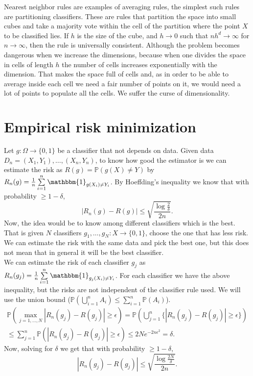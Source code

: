 \documentclass[11pt, english]{article}
\begin{document}
Nearest neighbor rules are examples of averaging rules, the simplest such rules are partitioning classifiers. These are rules that partition the space into small cubes and take a majority vote within the cell of the partition where the point $X$ to be classified lies. If $h$ is the size of the cube, and $h\rightarrow 0$ such that $nh^d\rightarrow \infty$ for $n\rightarrow\infty$, then the rule is universally consistent. 
Although the problem becomes dangerous when we increase the dimensions, because when one divides the space in cells of length $h$ the number of cells increases exponentially with the dimension. That makes the space full of cells and, as in order to be able to average inside each cell we need a fair number of points on it, we would need a lot of points to populate all the cells. We suffer the curse of dimensionality.\\

\section{Empirical risk minimization}

Let $g:\Omega\rightarrow\{0,1\}$ be a classifier that not depends on data. Given data $D_n=(X_1,Y_1),\dots,(X_n,Y_n)$, to know how good the estimator is we can estimate the risk as $R(g)=\mathbb{P}(g(X)\neq Y)$ by $R_n(g)=\frac{1}{n}\sum\limits_{i=1}^n\mathbbm{1}_{g(X_i)\neq Y_i}$. By Hoeffding's inequality we know that with probability $\geq 1-\delta$, 
\begin{equation}
	|R_n(g)-R(g)|\leq\sqrt{\frac{\log\frac{2}{\delta}}{2n}}.
\end{equation}
Now, the idea would be to know among different classifiers which is the best. That is given $N$ classifiers $g_1,\dots,g_N: X\rightarrow\{0,1\}$, choose the one that has less risk. We can estimate the risk with the same data and pick the best one, but this does not mean that in general it will be the best classifier.\\

We can estimate the risk of each classifier $g_j$ as $R_n(g_j)=\frac{1}{n}\sum\limits_{i=1}^n \mathbbm{1}_{g_j(X_i)\neq Y_i}$. For each classifier we have the above inequality, but the risks are not independent of the classifier rule used. We will use the union bound ($\mathbb{P}(\bigcup\limits_{i=1}^n A_i)\leq\sum\limits_{i=1}^n\mathbb{P}(A_i)$).
\begin{align}
	\mathbb{P}(\underset{j=1,\dots,N}{\max}|R_n(g_j)-R(g_j)|\geq\epsilon)=\mathbb{P}(\bigcup\limits_{j=1}^n\{|R_n(g_j)-R(g_j)|\geq \epsilon\})\\
	\leq\sum\limits_{j=1}^n\mathbb{P}(|R_n(g_j)-R(g_j)|\geq\epsilon)\leq 2Ne^{-2n\epsilon^2}=\delta.
\end{align}
Now, solving for $\delta$ we get that with probability $\geq 1-\delta$, \begin{equation}
	|R_n(g_j)-R(g_j)|\leq\sqrt{\frac{\log\frac{2 N}{\delta}}{2n}}.
\end{equation}
\end{document}
